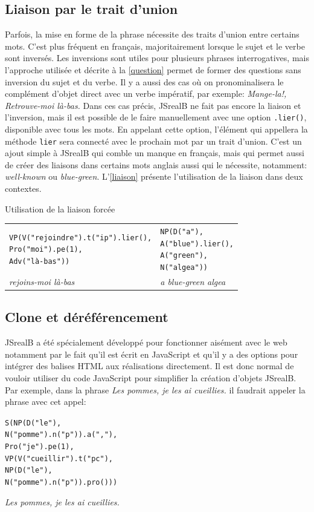 \documentclass[11pt]{article} %
\newcommand{\system}[1]{\textsf{#1}}
\newcommand{\JSB}{\system{JSrealB}}
\newcommand{\real}[1]{\emph{#1}}
\begin{document}
\subsection{Liaison par le trait d'union}
Parfois, la mise en forme de
la phrase nécessite des traits d'union entre certains mots. C'est
plus fréquent en français, majoritairement lorsque le sujet et le
verbe sont inversés.  Les inversions sont utiles pour plusieurs phrases
interrogatives, mais l'approche utilisée et décrite à la \autoref{question}
 permet de former des questions sans inversion du sujet
et du verbe. Il y a aussi des cas où on pronominalisera le complément
d'objet direct avec un verbe impératif, par exemple: \emph{Mange-la!,
Retrouve-moi là-bas. }Dans ces cas précis, \JSB{} ne fait pas encore
la liaison et l'inversion, mais il est possible de le faire manuellement
avec une option \texttt{.lier()}, disponible avec tous les mots. En
appelant cette option, l'élément qui appellera la méthode \texttt{lier}
sera connecté avec le prochain mot par un trait d'union. C'est un
ajout simple à \JSB{} qui comble un manque en français, mais qui
permet aussi de créer des liaisons dans certains mots anglais aussi
qui le nécessite, notamment: \emph{well-known} ou \emph{blue-green}. L'\autoref{liaison}
présente l'utilisation de la liaison dans deux contextes.
\begin{example}
\centering
\caption{Utilisation de la liaison forcée}
\begin{tabular}{p{7cm} p{7cm}} 
\begin{alltt}
VP(V("rejoindre").t("ip").lier(),
   Pro("moi").pe(1),
   Adv("là-bas"))
\end{alltt} &
\begin{alltt}
NP(D("a"),
   A("blue").lier(),
   A("green"),
   N("algea"))
\end{alltt} \\
\real{rejoins-moi là-bas} & \real{a blue-green algea}\\
\end{tabular}
\label{liaison}
\end{example}


\subsection{Clone et déréférencement}
\label{clone}
\JSB{} a été spécialement développé pour fonctionner aisément avec
le web notamment par le fait qu'il est écrit en JavaScript et qu'il
y a des options pour intégrer des balises HTML aux réalisations directement.
Il est donc normal de vouloir utiliser du code JavaScript pour simplifier
la création d'objets \JSB{}. Par exemple, dans la phrase \emph{Les
pommes, je les ai cueillies. }il faudrait appeler la phrase avec cet
appel:
\begin{example}
\caption{}
\begin{alltt}
S(NP(D("le"),
     N("pomme").n("p")).a(","),
  Pro("je").pe(1),
  VP(V("cueillir").t("pc"),
     NP(D("le"),
        N("pomme").n("p")).pro()))
\end{alltt}
\real{Les pommes, je les ai cueillies.} 
\end{example}
\end{document}
